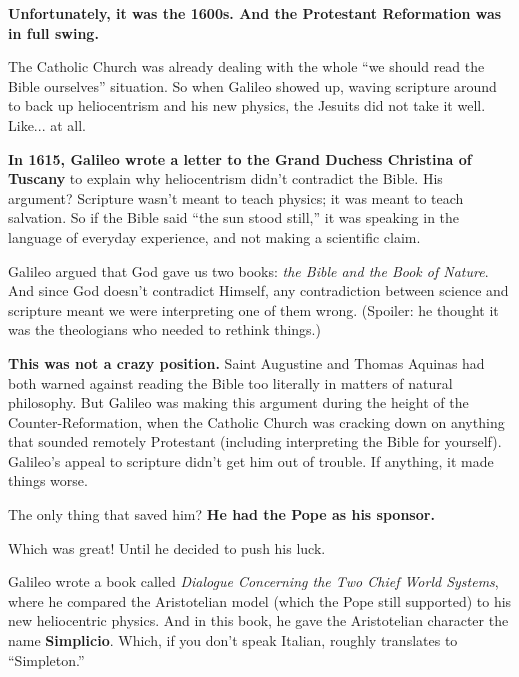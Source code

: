 \textbf{Unfortunately, it was the 1600s. And the Protestant Reformation was in full swing.}

The Catholic Church was already dealing with the whole ``we should read the Bible ourselves'' situation. So when Galileo showed up, waving scripture around to back up heliocentrism and his new physics, the Jesuits did not take it well. Like... at all.

\begin{tcolorbox}[colback=blue!5!white, colframe=blue!50!black, breakable, title=Historical Sidebar: Galileo and the Bible]

  \textbf{In 1615, Galileo wrote a letter to the Grand Duchess Christina of Tuscany} to explain why heliocentrism didn’t contradict the Bible. His argument? Scripture wasn’t meant to teach physics; it was meant to teach salvation. So if the Bible said “the sun stood still,” it was speaking in the language of everyday experience, and not making a scientific claim. 

  \medskip

  Galileo argued that God gave us two books: \emph{the Bible and the Book of Nature}. And since God doesn’t contradict Himself, any contradiction between science and scripture meant we were interpreting one of them wrong. (Spoiler: he thought it was the theologians who needed to rethink things.)

  \medskip

  \textbf{This was not a crazy position.} Saint Augustine and Thomas Aquinas had both warned against reading the Bible too literally in matters of natural philosophy. But Galileo was making this argument during the height of the Counter-Reformation, when the Catholic Church was cracking down on anything that sounded remotely Protestant (including interpreting the Bible for yourself). Galileo’s appeal to scripture didn’t get him out of trouble. If anything, it made things worse.

\end{tcolorbox}

The only thing that saved him? \textbf{He had the Pope as his sponsor.} 

Which was great! Until he decided to push his luck. 

Galileo wrote a book called \textit{Dialogue Concerning the Two Chief World Systems}, where he compared the Aristotelian model (which the Pope still supported) to his new heliocentric physics. And in this book, he gave the Aristotelian character the name \textbf{Simplicio}. Which, if you don’t speak Italian, roughly translates to “Simpleton.”

